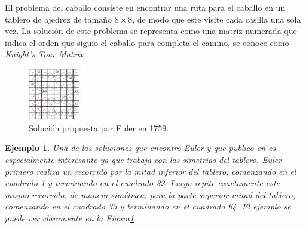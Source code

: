 \documentclass[journal, 10pt]{IEEEtran}
\newtheorem{example}{Ejemplo}
\begin{document}
El problema del caballo consiste en encontrar una ruta para el caballo en un tablero de ajedrez de tamaño $8 \times 8$, de modo que este visite cada casilla una sola vez. La soluci\'on de este problema se representa como una matriz numerada que indica el orden que siguio el caballo para completa el camino, se conoce como \textit{Knight's Tour Matrix} \cite{Kopec:2016}.

\begin{figure}[h]

\centering
\includegraphics[width=0.2\textwidth]{figures/EulerKT.png}
\caption{Soluci\'on propuesta por Euler en 1759.}
\label{fig:euler}

\end{figure}

\begin{example}
	Una de las soluciones que encontro Euler y que publico en \cite{Euler:1759} es especialmente interesante ya que trabaja con las simetrias del tablero. Euler primero realiza un recorrido  por la mitad inferior del tablero, comenzando en el cuadrado 1 y terminando en el cuadrado 32. Luego repite exactamente este mismo recorrido, de manera sim\'etrica, para la parte superior mitad del tablero, comenzando en el cuadrado 33 y terminando en el cuadrado 64. El ejemplo se puede ver claramente en la \textit{Figura\ref{fig:euler}} 
\end{example}


\end{document}
